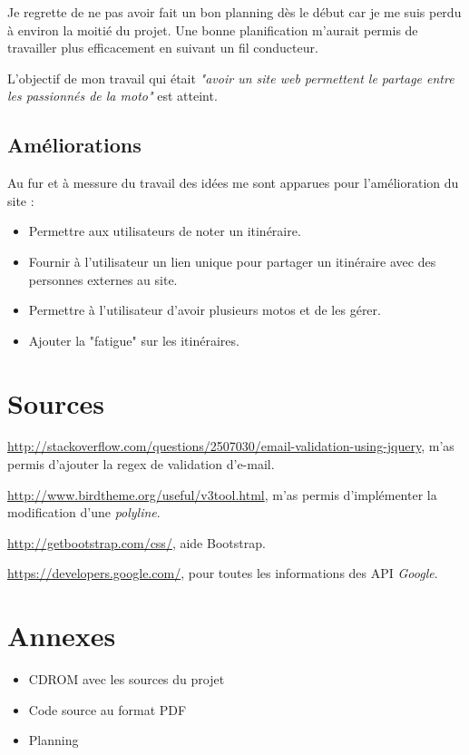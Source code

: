 \documentclass[a4paper]{article}
\begin{document}
Je regrette de ne pas avoir fait un bon planning dès le début car je me suis perdu à environ la moitié du projet. Une bonne planification m'aurait permis de travailler plus efficacement en suivant un fil conducteur.

L'objectif de mon travail qui était \emph{"avoir un site web permettent le partage entre les passionnés de la moto"} est atteint.
\subsection{Améliorations }
Au fur et à messure du travail des idées me sont apparues pour l'amélioration du site :
\begin{itemize}
	\item Permettre aux utilisateurs de noter un itinéraire.
	\item Fournir à l'utilisateur un lien unique pour partager un itinéraire avec des personnes externes au site.
	\item Permettre à l'utilisateur d'avoir plusieurs motos et de les gérer.
	\item Ajouter la "fatigue" sur les itinéraires.
\end{itemize}

\pagebreak
\section{Sources}
\url{http://stackoverflow.com/questions/2507030/email-validation-using-jquery}, m'as permis d'ajouter la regex de validation d'e-mail.

\url{http://www.birdtheme.org/useful/v3tool.html}, m'as permis d'implémenter la modification d'une \emph{polyline}.

\url{http://getbootstrap.com/css/}, aide Bootstrap.

\url{https://developers.google.com/}, pour toutes les informations des API \emph{Google}.

\newpage




\section{Annexes}
\begin{itemize}
	\item CDROM avec les sources du projet
	\item Code source au format PDF
	\item Planning
\end{itemize}
\newpage
\listoffigures
\end{document}
